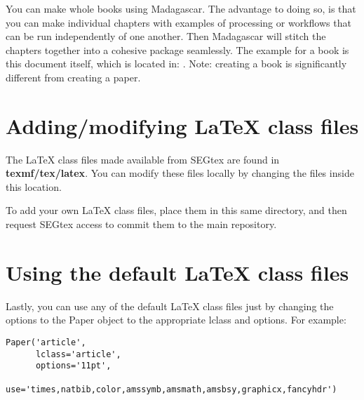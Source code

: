 You can make whole books using Madagascar.  The advantage to doing so, is that you can make individual chapters with examples of processing or workflows that can be run independently of one another.  Then Madagascar will stitch the chapters together into a cohesive package seamlessly.  The example for a book is this document itself, which is located in: \textbf{\maindir}.  Note: creating a book is significantly different from creating a paper.

\section{Adding/modifying LaTeX class files}

The LaTeX class files made available from SEGtex are found in \textbf{texmf/tex/latex}.  You can modify these files locally by changing the files inside this location.  

To add your own LaTeX class files, place them in this same directory, and then request SEGtex access to commit them to the main repository.

\section{Using the default LaTeX class files}

Lastly, you can use any of the default LaTeX class files just by changing the options to the Paper object to the appropriate lclass and options. For example:
\begin{verbatim}
Paper('article',
      lclass='article',
      options='11pt',
      use='times,natbib,color,amssymb,amsmath,amsbsy,graphicx,fancyhdr')
\end{verbatim}
